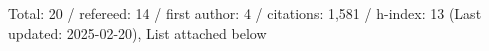 Total: 20 / refereed: 14 / first author: 4 / citations: 1,581 / h-index: 13 (Last updated: 2025-02-20), List attached below